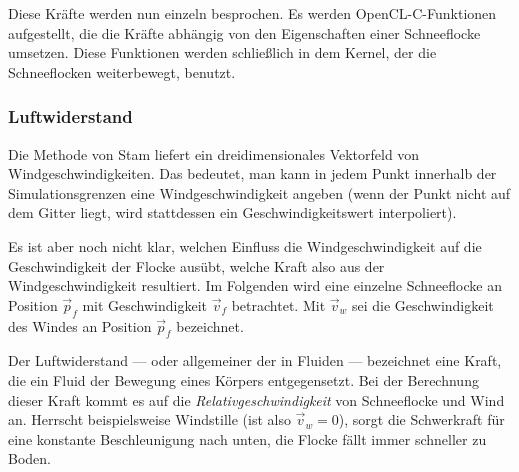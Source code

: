 Diese Kräfte werden nun einzeln besprochen. Es werden
OpenCL-C-Funktionen aufgestellt, die die Kräfte abhängig von den
Eigenschaften einer Schneeflocke umsetzen. Diese Funktionen werden
schließlich in dem Kernel, der die Schneeflocken weiterbewegt,
benutzt.

\subsubsection{Luftwiderstand}

Die Methode von Stam liefert ein dreidimensionales Vektorfeld von
Windgeschwindigkeiten. Das bedeutet, man kann in jedem Punkt innerhalb der
Simulationsgrenzen eine Windgeschwindigkeit angeben (wenn der Punkt
nicht auf dem Gitter liegt, wird stattdessen ein Geschwindigkeitswert
interpoliert).

Es ist aber noch nicht klar, welchen Einfluss die Windgeschwindigkeit
auf die Geschwindigkeit der Flocke ausübt, welche Kraft also aus der
Windgeschwindigkeit resultiert. Im Folgenden wird eine einzelne
Schneeflocke an Position $\vec{p}_f$ mit Geschwindigkeit $\vec{v}_{f}$
betrachtet. Mit $\vec{v}_w$ sei die Geschwindigkeit des Windes an
Position $\vec{p}_f$ bezeichnet.

Der Luftwiderstand --- oder allgemeiner der
 in Fluiden --- bezeichnet eine
Kraft, die ein Fluid der Bewegung eines Körpers entgegensetzt. Bei der
Berechnung dieser Kraft kommt es auf die \emph{Relativgeschwindigkeit}
von Schneeflocke und Wind an. Herrscht beispielsweise Windstille (ist
also $\vec{v}_w = 0$), sorgt die Schwerkraft für eine konstante
Beschleunigung nach unten, die Flocke fällt immer schneller zu Boden.


